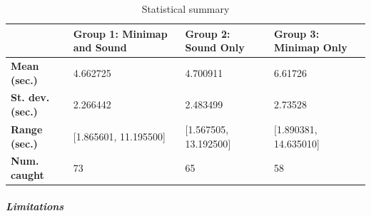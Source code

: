 \begin{table}[h]
	\begin{tabular}{|l|l|l|l|}
		\hline
		& \textbf{Group 1: Minimap and Sound} & \textbf{Group 2: Sound Only} & \textbf{Group 3: Minimap Only} \\ \hline
		\textbf{Mean (sec.)}  & 4.662725                            & 4.700911                     & 6.61726                        \\ \hline
		\textbf{St. dev. (sec.)}  & 2.266442                            & 2.483499                     & 2.73528                        \\ \hline
		\textbf{Range (sec.)} & {[}1.865601, 11.195500{]}           & {[}1.567505, 13.192500{]}    & {[}1.890381, 14.635010{]}      \\ \hline
		\textbf{Num. caught}  & 73                                  & 65                           & 58                             \\ \hline
	\end{tabular}

	\label{tab:final_study_stats}
	\caption{Statistical summary}
\end{table}

\subparagraph{Limitations}
